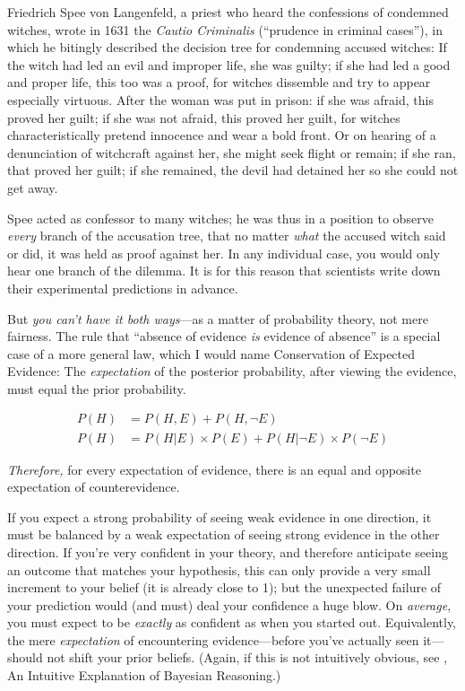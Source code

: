 \myendsectiontext


\bigskip

\label{conservation_of_expected_evidence}

{
 Friedrich Spee von Langenfeld, a priest who heard the confessions
of condemned witches, wrote in 1631 the \textit{Cautio Criminalis}
(``prudence in criminal cases''), in
which he bitingly described the decision tree for condemning accused
witches: If the witch had led an evil and improper life, she was
guilty; if she had led a good and proper life, this too was a proof,
for witches dissemble and try to appear especially virtuous. After the
woman was put in prison: if she was afraid, this proved her guilt; if
she was not afraid, this proved her guilt, for witches
characteristically pretend innocence and wear a bold front. Or on
hearing of a denunciation of witchcraft against her, she might seek
flight or remain; if she ran, that proved her guilt; if she remained,
the devil had detained her so she could not get away. }

{
 Spee acted as confessor to many witches; he was thus in a position
to observe \textit{every} branch of the accusation tree, that no matter
\textit{what} the accused witch said or did, it was held as proof
against her. In any individual case, you would only hear one branch of
the dilemma. It is for this reason that scientists write down their
experimental predictions in advance.}

{
 But \textit{you can't have it both ways}{}---as a
matter of probability theory, not mere fairness. The rule that
``absence of evidence \textit{is} evidence of
absence'' is a special case of a more general law,
which I would name Conservation of Expected Evidence: The
\textit{expectation} of the posterior probability, after viewing the
evidence, must equal the prior probability.}

\begin{align*}
 P(H) &= P(H,E) + P(H,\lnot E) \\
 P(H) &= P(H|E) \times P(E) + P(H|\lnot E) \times P(\lnot E)
\end{align*}

{
 \textit{Therefore,} for every expectation of evidence, there is an
equal and opposite expectation of counterevidence.}

{
 If you expect a strong probability of seeing weak evidence in one
direction, it must be balanced by a weak expectation of seeing strong
evidence in the other direction. If you're very
confident in your theory, and therefore anticipate seeing an outcome
that matches your hypothesis, this can only provide a very small
increment to your belief (it is already close to 1); but the unexpected
failure of your prediction would (and must) deal your confidence a huge
blow. On \textit{average}, you must expect to be \textit{exactly} as
confident as when you started out. Equivalently, the mere
\textit{expectation} of encountering evidence---before
you've actually seen it---should not shift your prior
beliefs. (Again, if this is not intuitively obvious, see \pageref{intuitive_bayesian}, An Intuitive
Explanation of Bayesian Reasoning.)}

